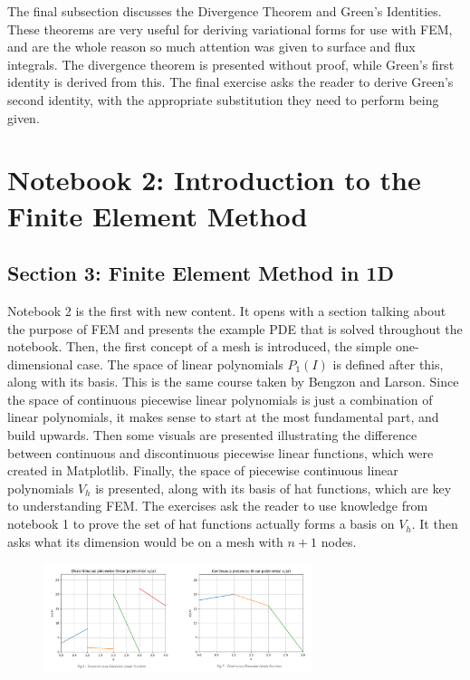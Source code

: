 The final subsection discusses the Divergence Theorem and Green's Identities. These theorems are very useful for deriving variational forms for use with FEM, and are the whole reason so much attention was given to surface and flux integrals. The divergence theorem is presented without proof, while Green's first identity is derived from this. The final exercise asks the reader to derive Green's second identity, with the appropriate substitution they need to perform being given.

\section{Notebook 2: Introduction to the Finite Element Method}

\subsection{Section 3: Finite Element Method in 1D}

Notebook 2 is the first with new content. It opens with a section talking about the purpose of FEM and presents the example PDE that is solved throughout the notebook. Then, the first concept of a mesh is introduced, the simple one-dimensional case. The space of linear polynomials $P_1(I)$ is defined after this, along with its basis. This is the same course taken by Bengzon and Larson. Since the space of continuous piecewise linear polynomials is just a combination of linear polynomials, it makes sense to start at the most fundamental part, and build upwards. Then some visuals are presented illustrating the difference between continuous and discontinuous piecewise linear functions, which were created in Matplotlib. Finally, the space of piecewise continuous linear polynomials $V_h$ is presented, along with its basis of hat functions, which are key to understanding FEM. The exercises ask the reader to use knowledge from notebook 1 to prove the set of hat functions actually forms a basis on $V_h$. It then asks what its dimension would be on a mesh with $n+1$ nodes. 

\begin{figure}[h]
\centering
\includegraphics[width=0.7\textwidth, frame]{./images/notebook2/1}
\end{figure}

